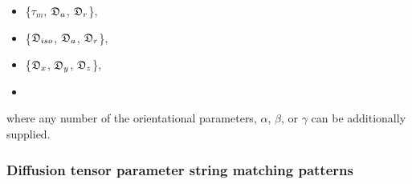  \begin{itemize} 
 \item[] \{$\tau_m$, $\mathfrak{D}_a$, $\mathfrak{D}_r$\},  
 \item[] \{$\mathfrak{D}_{iso}$, $\mathfrak{D}_a$, $\mathfrak{D}_r$\},  
 \item[] \{$\mathfrak{D}_x$, $\mathfrak{D}_y$, $\mathfrak{D}_z$\},  
 \item[]  
 \end{itemize} 
  

 where any number of the orientational parameters, $\alpha$, $\beta$, or $\gamma$ can be additionally supplied. 
  

  
 \subsubsection{Diffusion tensor parameter string matching patterns} 

